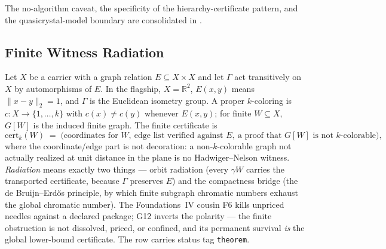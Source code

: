 \documentclass[11pt]{article}
\newcommand{\lawGTwelve}{Finite Witness Radiation}
\theoremstyle{definition}
\begin{document}
The no-algorithm caveat, the specificity of the hierarchy-certificate pattern, and the
quasicrystal-model boundary are consolidated in .

\subsection{\lawGTwelve}\label{sec:clusterD:g12}

Let $X$ be a carrier with a graph relation $E \subseteq X \times X$ and let $\Gamma$ act transitively
on $X$ by automorphisms of $E$. In the flagship, $X = \mathbb{R}^2$, $E(x,y)$ means
$\lVert x - y \rVert_2 = 1$, and $\Gamma$ is the Euclidean isometry group. A proper $k$-coloring is
$c : X \to \{1, \ldots, k\}$ with $c(x) \neq c(y)$ whenever $E(x,y)$; for finite $W \subseteq X$,
$G[W]$ is the induced finite graph. The finite certificate is
\[
  \mathrm{cert}_k(W) \;=\;
  \bigl(\text{coordinates for } W,\ \text{edge list verified against } E,\
  \text{a proof that } G[W] \text{ is not } k\text{-colorable}\bigr),
\]
where the coordinate/edge part is not decoration: a non-$k$-colorable graph not actually realized at
unit distance in the plane is no Hadwiger--Nelson witness. \emph{Radiation} means exactly two things
--- orbit radiation (every $\gamma W$ carries the transported certificate, because $\Gamma$ preserves
$E$) and the compactness bridge (the de Bruijn--Erd\H{o}s principle, by which finite subgraph
chromatic numbers exhaust the global chromatic number). The Foundations~IV cousin F6 kills unpriced
needles against a declared package; G12 inverts the polarity --- the finite obstruction is not
dissolved, priced, or confined, and its permanent survival \emph{is} the global lower-bound
certificate. The row carries status tag \texttt{theorem}.
\end{document}
